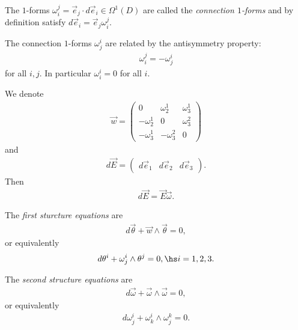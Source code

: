 \documentclass{article}
\begin{document}
\begin{definition}
    The $1$-forms $\omega_i^j=\vec e_j\cdot d\vec e_i\in\Omega^1(D)$ are called the 
    \emph{connection $1$-forms} and by definition satisfy $d\vec e_i = \vec e_j\omega_i^j$.
\end{definition}

\begin{proposition}
    The connection $1$-forms $\omega_j^i$ are related by the antisymmetry property: 
    \begin{align*}
        \omega_i^j = -\omega_j^i
    \end{align*}
    for all $i,j$. In particular $\omega_i^i = 0$ for all $i$.
\end{proposition}

\begin{lemma}
    We denote 
    \begin{align*}
        \vec w = \begin{pmatrix}
            0           & \omega_2^1  & \omega_3^1 \\
            -\omega_2^1 & 0           & \omega_3^2 \\
            -\omega_3^1 & -\omega_3^2 & 0
        \end{pmatrix}
    \end{align*}
    and 
    \begin{align*}
        d\vec E = \begin{pmatrix}
            d\vec e_1 & d\vec e_2 & d\vec e_3
        \end{pmatrix}.
    \end{align*}
    Then 
    \begin{align*}
        d\vec E = \vec E\vec\omega.
    \end{align*}
\end{lemma}

\begin{theorem}
    The \emph{first sturcture equations} are 
    \begin{align*}
        d\vec\theta + \vec w \wedge \vec \theta = 0,
    \end{align*}
    or equivalently 
    \begin{align*}
        d\theta^i + \omega_j^i \wedge \theta^j = 0,\hs i=1,2,3.
    \end{align*}
\end{theorem}

\begin{theorem}
    The \emph{second structure equations} are 
    \begin{align*}
        d\vec\omega + \vec \omega \wedge\vec \omega = 0,
    \end{align*}
    or equivalently 
    \begin{align*}
        d\omega_j^i + \omega_k^i\wedge\omega_j^k=0.
    \end{align*}
\end{theorem}
\end{document}
